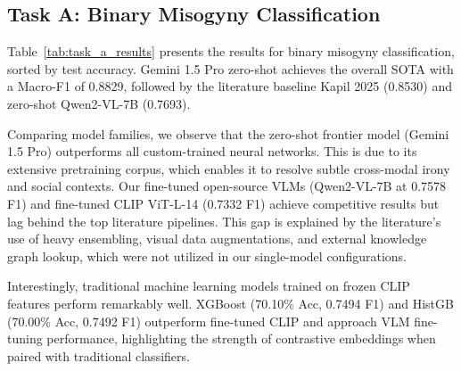 \documentclass[11pt]{article}
\begin{document}
\subsection{Task A: Binary Misogyny Classification}
Table~\ref{tab:task_a_results} presents the results for binary misogyny classification, sorted by test accuracy. Gemini 1.5 Pro zero-shot achieves the overall SOTA with a Macro-F1 of 0.8829, followed by the literature baseline Kapil 2025 (0.8530) and zero-shot Qwen2-VL-7B (0.7693).

Comparing model families, we observe that the zero-shot frontier model (Gemini 1.5 Pro) outperforms all custom-trained neural networks. This is due to its extensive pretraining corpus, which enables it to resolve subtle cross-modal irony and social contexts. Our fine-tuned open-source VLMs (Qwen2-VL-7B at 0.7578 F1) and fine-tuned CLIP ViT-L-14 (0.7332 F1) achieve competitive results but lag behind the top literature pipelines. This gap is explained by the literature's use of heavy ensembling, visual data augmentations, and external knowledge graph lookup, which were not utilized in our single-model configurations.

Interestingly, traditional machine learning models trained on frozen CLIP features perform remarkably well. XGBoost (70.10\% Acc, 0.7494 F1) and HistGB (70.00\% Acc, 0.7492 F1) outperform fine-tuned CLIP and approach VLM fine-tuning performance, highlighting the strength of contrastive embeddings when paired with traditional classifiers.
\end{document}
